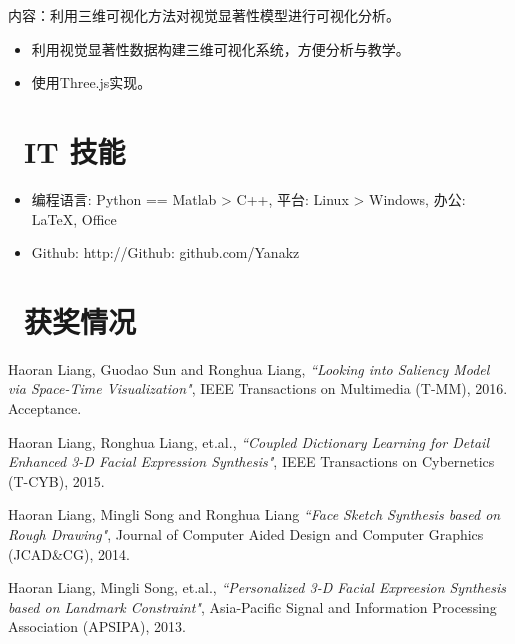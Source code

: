 \documentclass{resume}
\begin{document}
\begin{onehalfspacing}
	内容：利用三维可视化方法对视觉显著性模型进行可视化分析。
	\begin{itemize}
		\item 利用视觉显著性数据构建三维可视化系统，方便分析与教学。
		\item 使用Three.js实现。
	\end{itemize}
\end{onehalfspacing}


\section{\faCogs\ IT 技能}\small
\begin{itemize}[parsep=0.5ex]
  \item 编程语言: Python == Matlab > C++,  平台: Linux > Windows,  办公: \LaTeX, Office
  \item Github: http://Github: github.com/Yanakz
\end{itemize}

\section{\faHeartO\ 获奖情况}\small
{}


%
%
\begin{thebibliography}{5}\small
	
Haoran Liang, Guodao Sun and Ronghua Liang, 
\emph{``Looking into Saliency	Model via Space-Time Visualization"},
IEEE Transactions on Multimedia (T-MM), 2016. Acceptance.
	
Haoran Liang, Ronghua Liang, et.al.,
\emph{``Coupled Dictionary Learning for Detail Enhanced 3-D Facial Expression Synthesis"},
IEEE Transactions on Cybernetics (T-CYB), 2015.		


Haoran Liang, Mingli Song and Ronghua Liang
\emph{``Face Sketch Synthesis based on Rough Drawing"},
Journal of Computer Aided Design and Computer Graphics (JCAD\&CG), 2014.

Haoran Liang, Mingli Song, et.al.,
\emph{``Personalized 3-D Facial Expreesion Synthesis based on Landmark Constraint"},
Asia-Pacific Signal and Information Processing Association (APSIPA), 2013.
\end{thebibliography}
\end{document}
